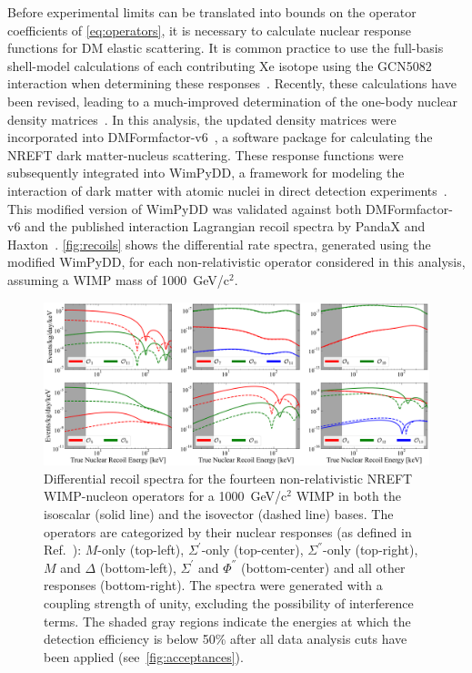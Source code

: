 \documentclass[reprint, showpacs,
preprintnumbers,
amsmath,amssymb,
aps, floatfix,
superscriptaddress,
prd, nofootinbib]{revtex4-1}
\begin{document}
\par
Before experimental limits can be translated into bounds on the operator coefficients of \autoref{eq:operators}, it is necessary to calculate nuclear response functions for DM elastic scattering. 
It is common practice to use the full-basis shell-model calculations of each contributing Xe isotope using the GCN5082 interaction when determining these responses~\cite{MENENDEZ2009139}. 
Recently, these calculations have been revised, leading to a much-improved determination of the one-body nuclear density matrices~\cite{haxton_unpublished}.
In this analysis, the updated density matrices were incorporated into DMFormfactor-v6~\cite{Anand:MathematicaEFT}, a software package for calculating the NREFT dark matter-nucleus scattering. 
These response functions were subsequently integrated into WimPyDD, a framework for modeling the interaction of dark matter with atomic nuclei in direct detection experiments~\cite{Jeong_2022}. 
This modified version of WimPyDD was validated against both DMFormfactor-v6 and the published interaction Lagrangian recoil spectra by PandaX and Haxton~\cite{PandaX2:SD_EFT_2019}.
\autoref{fig:recoils} shows the differential rate spectra, generated using the modified WimPyDD, for each non-relativistic operator considered in this analysis, assuming a WIMP mass of 1000~GeV/c$^2$.


\begin{figure}[hbt!]
    \centering
    \includegraphics[trim={8 5 5 5},clip, width=\textwidth]{logx_logy_m1000GeV_recoils-4}
    \caption{
    Differential recoil spectra for the fourteen non-relativistic NREFT WIMP-nucleon operators for a 1000~GeV/c$^2$ WIMP in both the isoscalar (solid line) and the isovector (dashed line) bases.
    The operators are categorized by their nuclear responses (as defined in Ref.~\cite{Anand:MathematicaEFT}): $M$-only (top-left), $\Sigma^{'}$-only (top-center), $\Sigma^{''}$-only (top-right), $M$ and $\Delta$ (bottom-left), $\Sigma^{'}$ and $\Phi^{''}$ (bottom-center) and all other responses (bottom-right).
    The spectra were generated with a coupling strength of unity, excluding the possibility of interference terms. 
    The shaded gray regions indicate the energies at which the detection efficiency is below 50\% after all data analysis cuts have been applied (see~\autoref{fig:acceptances}).}
    \label{fig:recoils}
\end{figure}
\end{document}
